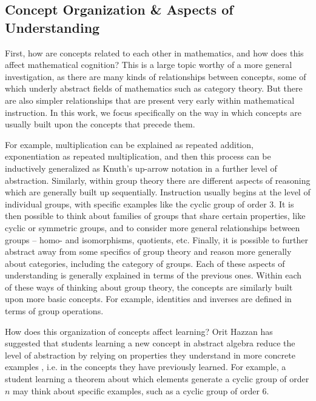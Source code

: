 \documentclass[man,10pt]{apa6}
\begin{document}
\subsection{Concept Organization \& Aspects of Understanding} %
First, how are concepts related to each other in mathematics, and how does this affect mathematical cognition? This is a large topic worthy of a more general investigation, as there are many kinds of relationships between concepts, some of which underly abstract fields of mathematics such as category theory. But there are also simpler relationships that are present very early within mathematical instruction. In this work, we focus specifically on the way in which concepts are usually built upon the concepts that precede them. \par
For example, multiplication can be explained as repeated addition, exponentiation as repeated multiplication, and then this process can be inductively generalized as Knuth's up-arrow notation in a further level of abstraction. Similarly, within group theory there are different aspects of reasoning which are generally built up sequentially. Instruction usually begins at the level of individual groups, with specific examples like the cyclic group of order 3. It is then possible to think about families of groups that share certain properties, like cyclic or symmetric groups, and to consider more general relationships between groups -- homo- and isomorphisms, quotients, etc. Finally, it is possible to further abstract away from some specifics of group theory and reason more generally about categories, including the category of groups. Each of these aspects of understanding is generally explained in terms of the previous ones. Within each of these ways of thinking about group theory, the concepts are similarly built upon more basic concepts. For example, identities and inverses are defined in terms of group operations.\par
How does this organization of concepts affect learning? Orit Hazzan has suggested that students learning a new concept in abstract algebra reduce the level of abstraction by relying on properties they understand in more concrete examples \cite{Hazzan1999}, i.e. in the concepts they have previously learned. For example, a student learning a theorem about which elements generate a cyclic group of order $n$ may think about specific examples, such as a cyclic group of order 6.\par 
\end{document}
